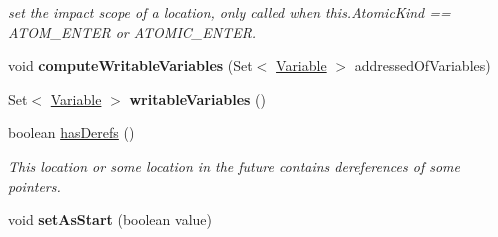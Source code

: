 \begin{DoxyCompactItemize}
\begin{DoxyCompactList}\small\item\em set the impact scope of a location, only called when this.\+Atomic\+Kind == A\+T\+O\+M\+\_\+\+E\+N\+T\+E\+R or A\+T\+O\+M\+I\+C\+\_\+\+E\+N\+T\+E\+R. \end{DoxyCompactList}\item 
\hypertarget{interfaceedu_1_1udel_1_1cis_1_1vsl_1_1civl_1_1model_1_1IF_1_1location_1_1Location_a7183c4ae74c5db812454d133845103f6}{}void {\bfseries compute\+Writable\+Variables} (Set$<$ \hyperlink{interfaceedu_1_1udel_1_1cis_1_1vsl_1_1civl_1_1model_1_1IF_1_1variable_1_1Variable}{Variable} $>$ addressed\+Of\+Variables)\label{interfaceedu_1_1udel_1_1cis_1_1vsl_1_1civl_1_1model_1_1IF_1_1location_1_1Location_a7183c4ae74c5db812454d133845103f6}

\item 
\hypertarget{interfaceedu_1_1udel_1_1cis_1_1vsl_1_1civl_1_1model_1_1IF_1_1location_1_1Location_a7f987e240fb387532c3526dd1701ad67}{}Set$<$ \hyperlink{interfaceedu_1_1udel_1_1cis_1_1vsl_1_1civl_1_1model_1_1IF_1_1variable_1_1Variable}{Variable} $>$ {\bfseries writable\+Variables} ()\label{interfaceedu_1_1udel_1_1cis_1_1vsl_1_1civl_1_1model_1_1IF_1_1location_1_1Location_a7f987e240fb387532c3526dd1701ad67}

\item 
boolean \hyperlink{interfaceedu_1_1udel_1_1cis_1_1vsl_1_1civl_1_1model_1_1IF_1_1location_1_1Location_a86ca6e13969746fbc2136b73c0338fdb}{has\+Derefs} ()
\begin{DoxyCompactList}\small\item\em This location or some location in the future contains dereferences of some pointers. \end{DoxyCompactList}\item 
\hypertarget{interfaceedu_1_1udel_1_1cis_1_1vsl_1_1civl_1_1model_1_1IF_1_1location_1_1Location_a210924654823b493a2cf341fd23ba8ee}{}void {\bfseries set\+As\+Start} (boolean value)\label{interfaceedu_1_1udel_1_1cis_1_1vsl_1_1civl_1_1model_1_1IF_1_1location_1_1Location_a210924654823b493a2cf341fd23ba8ee}


\end{DoxyCompactItemize}
